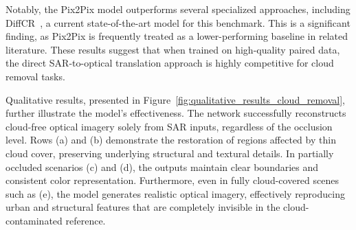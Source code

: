 \documentclass[remotesensing,article,submit,pdftex,moreauthors]{Definitions/mdpi}
\begin{document}
Notably, the Pix2Pix model outperforms several specialized approaches, including DiffCR~\cite{DiffCR}, a current state-of-the-art model for this benchmark. This is a significant finding, as Pix2Pix is frequently treated as a lower-performing baseline in related literature. These results suggest that when trained on high-quality paired data, the direct SAR-to-optical translation approach is highly competitive for cloud removal tasks.

Qualitative results, presented in Figure~\ref{fig:qualitative_results_cloud_removal}, further illustrate the model’s effectiveness. The network successfully reconstructs cloud-free optical imagery solely from SAR inputs, regardless of the occlusion level. Rows (a) and (b) demonstrate the restoration of regions affected by thin cloud cover, preserving underlying structural and textural details. In partially occluded scenarios (c) and (d), the outputs maintain clear boundaries and consistent color representation. Furthermore, even in fully cloud-covered scenes such as (e), the model generates realistic optical imagery, effectively reproducing urban and structural features that are completely invisible in the cloud-contaminated reference.
\end{document}

